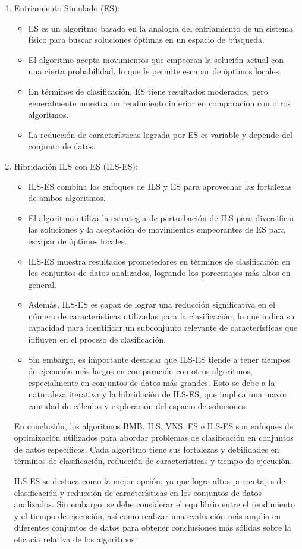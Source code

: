\begin{enumerate}
\item Enfriamiento Simulado (ES):
\begin{itemize}
\item ES es un algoritmo basado en la analogía del enfriamiento de un sistema físico para buscar soluciones óptimas en un espacio de búsqueda.
\item El algoritmo acepta movimientos que empeoran la solución actual con una cierta probabilidad, lo que le permite escapar de óptimos locales.
\item En términos de clasificación, ES tiene resultados moderados, pero generalmente muestra un rendimiento inferior en comparación con otros algoritmos.
\item La reducción de características lograda por ES es variable y depende del conjunto de datos.

\end{itemize}

\item Hibridación ILS con ES (ILS-ES):
\begin{itemize}
\item ILS-ES combina los enfoques de ILS y ES para aprovechar las fortalezas de ambos algoritmos.
\item El algoritmo utiliza la estrategia de perturbación de ILS para diversificar las soluciones y la aceptación de movimientos empeorantes de ES para escapar de óptimos locales.
\item ILS-ES muestra resultados prometedores en términos de clasificación en los conjuntos de datos analizados, logrando los porcentajes más altos en general.
\item Además, ILS-ES es capaz de lograr una reducción significativa en el número de características utilizadas para la clasificación, lo que indica su capacidad para identificar un subconjunto relevante de características que influyen en el proceso de clasificación.

\item Sin embargo, es importante destacar que ILS-ES tiende a tener tiempos de ejecución más largos en comparación con otros algoritmos, especialmente en conjuntos de datos más grandes. Esto se debe a la naturaleza iterativa y la hibridación de ILS-ES, que implica una mayor cantidad de cálculos y exploración del espacio de soluciones.
\end{itemize}

En conclusión, los algoritmos BMB, ILS, VNS, ES e ILS-ES son enfoques de optimización utilizados para abordar problemas de clasificación en conjuntos de datos específicos. Cada algoritmo tiene sus fortalezas y debilidades en términos de clasificación, reducción de características y tiempo de ejecución.

ILS-ES se destaca como la mejor opción, ya que logra altos porcentajes de clasificación y reducción de características en los conjuntos de datos analizados. Sin embargo, se debe considerar el equilibrio entre el rendimiento y el tiempo de ejecución, así como realizar una evaluación más amplia en diferentes conjuntos de datos para obtener conclusiones más sólidas sobre la eficacia relativa de los algoritmos.
\end{enumerate}

\newpage



